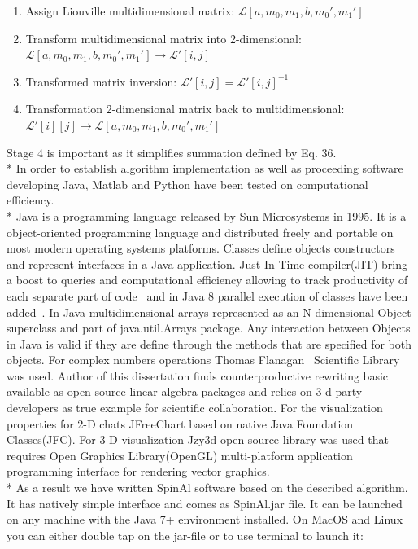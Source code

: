 \begin{center}
\begin{enumerate}
\item Assign Liouville multidimensional matrix: $\mathcal{L}[a,m_0,m_1,b,m_0',m_1']$
\item Transform multidimensional matrix into 2-dimensional: $\mathcal{L}[a,m_0,m_1,b,m_0',m_1'] \rightarrow \mathcal{L}'[i,j]$ 
\item Transformed matrix inversion: $\mathcal{L}'[i,j]=\mathcal{L}'[i,j]^{-1}$
\item Transformation 2-dimensional matrix back to multidimensional: \\ $\mathcal{L}'[i][j]\rightarrow \mathcal{L}[a,m_0,m_1,b,m_0',m_1']$ 
\end{enumerate}   
\end{center}    
Stage 4 is important as it simplifies summation defined by Eq. 36. \\*
In order to establish algorithm implementation as well as proceeding software developing Java, Matlab and Python have been tested on computational efficiency. \\*
Java is  a programming language released by Sun Microsystems in 1995. It is a object-oriented programming language and distributed freely and portable on most modern operating systems platforms. Classes define objects constructors and represent interfaces in a Java application. Just In Time compiler(JIT) bring a boost to queries and computational efficiency allowing to track productivity of each separate part of code~\cite{hortell} and in Java 8 parallel execution of classes have been added~\cite{javapal}. In Java multidimensional arrays represented as an N-dimensional Object superclass and part of java.util.Arrays package. Any interaction between Objects in Java is valid if they are define through the methods that are specified for both objects. For complex numbers operations Thomas Flanagan~\cite{flanagan} Scientific Library was used. Author of this dissertation finds counterproductive rewriting basic available as open source linear algebra packages and relies on 3-d party developers as true example for scientific collaboration. For the visualization properties for 2-D chats JFreeChart based on native Java Foundation Classes(JFC). For 3-D visualization Jzy3d open source library was used that requires Open Graphics Library(OpenGL)  multi-platform application programming interface for rendering vector graphics.\\*
As a result we have written SpinAl software based on the described algorithm. It has natively simple interface and comes as SpinAl.jar file. It can be launched on any machine with the Java 7+ environment installed. On MacOS and Linux you can either double tap on the jar-file or to use terminal to launch it:
